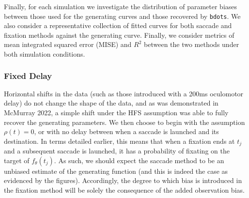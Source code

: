 \documentclass{article}
\newcommand{\xt}{\texttt}%
\begin{document}
Finally, for each simulation we investigate the distribution of parameter biases between those used for the generating curves and those recovered by \xt{bdots}. We also consider a representative collection of fitted curves for both saccade and fixation  methods against the generating curve. Finally, we consider metrics of mean integrated squared error (MISE) and $R^2$ between the two methods under both simulation conditions. 
 
 
 

\subsubsection{Fixed Delay}

Horizontal shifts in the data (such as those introduced with a 200ms oculomotor delay) do not change the shape of the data, and as was demonstrated in McMurray 2022, a simple shift under the HFS assumption was able to fully recover the generating parameters. We then choose to begin with the assumption $\rho(t) = 0$, or with no delay between when a saccade is launched and its destination. In terms detailed earlier, this means that when a fixation ends at $t_j$ and a subsequent saccade is launched, it has a probability of fixating on the target of $f_{\theta}(t_j)$. As such, we should expect the saccade method to be an unbiased estimate of the generating function (and this is indeed the case as evidenced by the figures). Accordingly, the degree to which bias is introduced in the fixation method will be solely the consequence of the added observation bias.
\end{document}

